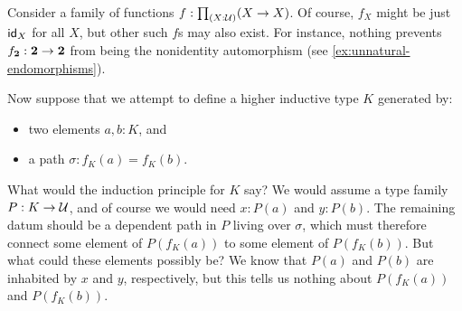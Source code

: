 \documentclass[hott-all.tex]{subfiles}
\begin{document}
% 
% 
% 
\begin{eg}
  Consider a family of functions $f:\prd{X:\type} (X\to X)$.
  Of course, $f_X$ might be just $\idfunc[X]$ for all $X$, but other such $f$s may also exist.
  For instance, nothing prevents $f_{\bool}:\bool\to\bool$ from being the nonidentity automorphism (see \cref{ex:unnatural-endomorphisms}).

  Now suppose that we attempt to define a higher inductive type $K$ generated by:
  \begin{itemize}
  \item two elements $a,b:K$, and
  \item a path $\sigma:f_K(a)=f_K(b)$.
  \end{itemize}
  What would the induction principle for $K$ say?
  We would assume a type family $P:K\to\type$, and of course we would need $x:P(a)$ and $y:P(b)$.
  The remaining datum should be a dependent path in $P$ living over $\sigma$, which must therefore connect some element of $P(f_K(a))$ to some element of $P(f_K(b))$.
  But what could these elements possibly be?
  We know that $P(a)$ and $P(b)$ are inhabited by $x$ and $y$, respectively, but this tells us nothing about $P(f_K(a))$ and $P(f_K(b))$.
\end{eg}
\end{document}

